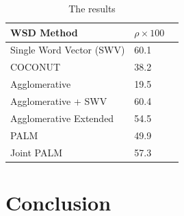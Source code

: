\documentclass[11pt]{article}
\begin{document}
\begin{table}
\center
    \begin{tabular}{|l|l|l|}
    \hline
    \textbf{WSD Method} & $\rho \times 100$ \\ \hline
    Single Word Vector (SWV) & 60.1 \\ \hline
    COCONUT & 38.2 \\ \hline
    Agglomerative & 19.5 \\ \hline
    Agglomerative + SWV & 60.4 \\ \hline
    Agglomerative Extended & 54.5 \\ \hline
    PALM & 49.9 \\ \hline
    Joint PALM & 57.3 \\ \hline
    \end{tabular}
    \caption{The results}
\end{table}

\section{Conclusion}



\end{document}
